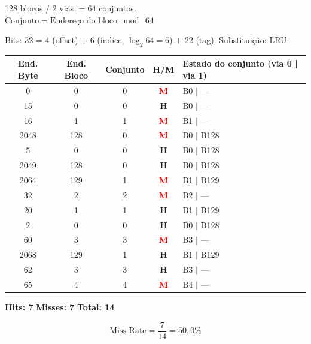 \documentclass[12pt, a4paper]{article}
\begin{document}
128 blocos / 2 vias $= 64$ conjuntos.\\
$\text{Conjunto} = \text{Endereço do bloco}\ \bmod\ 64$

Bits: 32 = 4 (offset) + 6 (índice, $\log_2 64 = 6$) + 22 (tag). Substituição: LRU.

\vspace{4pt}
\begin{tabular}{ccccp{4cm}}
  \toprule
  \textbf{End. Byte} & \textbf{End. Bloco} & \textbf{Conjunto} & \textbf{H/M} & \textbf{Estado do conjunto (via 0 | via 1)}\\
  \midrule
  0    & 0   & 0 & \textcolor{red}{\textbf{M}} & B0 $|$ ---  \\
  15   & 0   & 0 & \textcolor{green!60!black}{\textbf{H}} & B0 $|$ ---  \\
  16   & 1   & 1 & \textcolor{red}{\textbf{M}} & B1 $|$ ---  \\
  2048 & 128 & 0 & \textcolor{red}{\textbf{M}} & B0 $|$ B128 \\
  5    & 0   & 0 & \textcolor{green!60!black}{\textbf{H}} & B0 $|$ B128 \\
  2049 & 128 & 0 & \textcolor{green!60!black}{\textbf{H}} & B0 $|$ B128 \\
  2064 & 129 & 1 & \textcolor{red}{\textbf{M}} & B1 $|$ B129 \\
  32   & 2   & 2 & \textcolor{red}{\textbf{M}} & B2 $|$ ---  \\
  20   & 1   & 1 & \textcolor{green!60!black}{\textbf{H}} & B1 $|$ B129 \\
  2    & 0   & 0 & \textcolor{green!60!black}{\textbf{H}} & B0 $|$ B128 \\
  60   & 3   & 3 & \textcolor{red}{\textbf{M}} & B3 $|$ ---  \\
  2068 & 129 & 1 & \textcolor{green!60!black}{\textbf{H}} & B1 $|$ B129 \\
  62   & 3   & 3 & \textcolor{green!60!black}{\textbf{H}} & B3 $|$ ---  \\
  65   & 4   & 4 & \textcolor{red}{\textbf{M}} & B4 $|$ ---  \\
  \bottomrule
\end{tabular}

\vspace{6pt}
\textbf{Hits: 7} \quad \textbf{Misses: 7} \quad \textbf{Total: 14}

\begin{caixaazul}
  \[
    \text{Miss Rate} = \frac{7}{14} = 50{,}0\%
  \]
\end{caixaazul}
\end{document}
